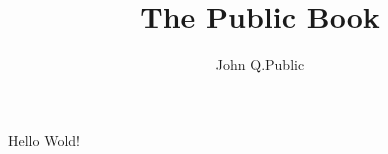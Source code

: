 \documentclass[]{book}
\author{John Q.Public}\title{The Public Book}
\begin{document}
\frontmatter
%
%
\mainmatter
Hello Wold!%
%
%
%
\backmatter
%
\end{document}
